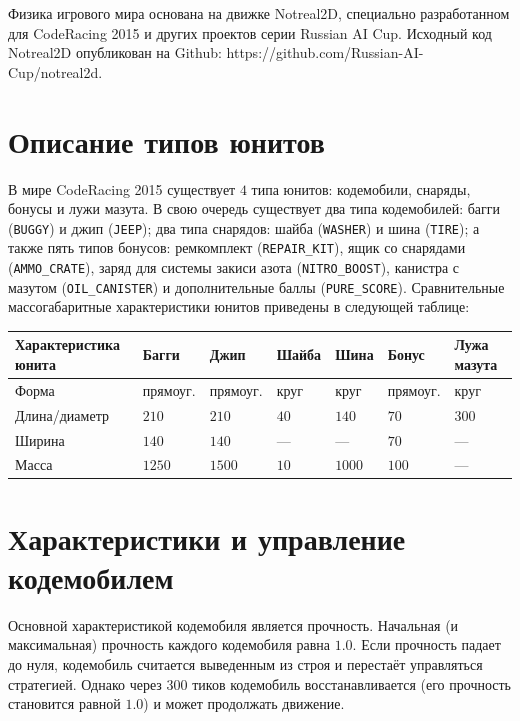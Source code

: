Физика игрового мира основана на движке Notreal2D, специально разработанном для CodeRacing 2015 и других проектов серии Russian AI Cup.
Исходный код Notreal2D опубликован на Github: https://github.com/Russian-AI-Cup/notreal2d.

\section{Описание типов юнитов}

В мире CodeRacing 2015 существует $4$ типа юнитов: кодемобили, снаряды, бонусы и лужи мазута. В свою очередь существует два типа
кодемобилей: багги (\texttt{BUGGY}) и джип (\texttt{JEEP}); два типа снарядов: шайба (\texttt{WASHER}) и шина (\texttt{TIRE}); а также пять
типов бонусов: ремкомплект (\texttt{REPAIR\_KIT}), ящик со снарядами (\texttt{AMMO\_CRATE}), заряд для системы закиси азота
(\texttt{NITRO\_BOOST}), канистра с мазутом (\texttt{OIL\_CANISTER}) и дополнительные баллы (\texttt{PURE\_SCORE}). Сравнительные
массогабаритные характеристики юнитов приведены в следующей таблице:

\begin{tabular}{| l | l | l | l | l | l | l |}
  \hline
  Характеристика юнита & Багги    & Джип     & Шайба & Шина   & Бонус    & Лужа мазута \\
  \hline
  Форма                & прямоуг. & прямоуг. & круг  & круг   & прямоуг. & круг        \\
  Длина/диаметр        & $210$    & $210$    & $40$  & $140$  & $70$     & $300$       \\
  Ширина               & $140$    & $140$    & ---   & ---    & $70$     & ---         \\
  Масса                & $1250$   & $1500$   & $10$  & $1000$ & $100$    & ---         \\
  \hline
\end{tabular}

\section{Характеристики и управление кодемобилем}

Основной характеристикой кодемобиля является прочность. Начальная (и максимальная) прочность каждого кодемобиля равна $1.0$. Если прочность
падает до нуля, кодемобиль считается выведенным из строя и перестаёт управляться стратегией. Однако через $300$ тиков кодемобиль
восстанавливается (его прочность становится равной $1.0$) и может продолжать движение.


